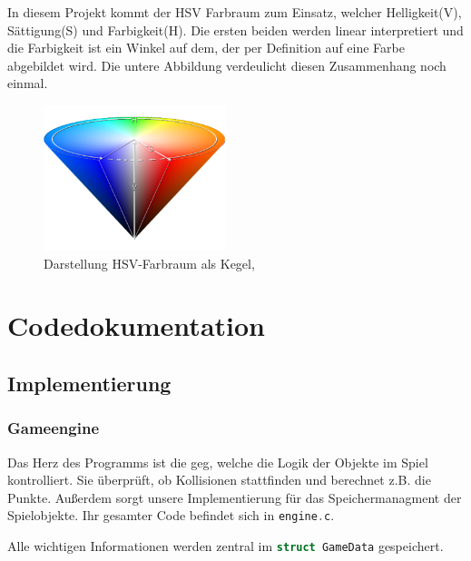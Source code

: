 \documentclass[11pt]{article}
\newcommand{\lstin}[1]{\lstinline[language=C]{#1}}
\begin{document}
In diesem Projekt kommt der HSV Farbraum zum Einsatz, welcher Helligkeit(V), Sättigung(S) und Farbigkeit(H).
Die ersten beiden werden linear interpretiert und die Farbigkeit ist ein Winkel auf dem, der per Definition auf eine Farbe abgebildet wird.
Die untere Abbildung verdeulicht diesen Zusammenhang noch einmal. 
\cite{CS2}
\begin{figure}[h]
  \centering
  \includegraphics[width=200px]{../images/hsv.png}
  \caption{Darstellung HSV-Farbraum als Kegel, \cite{picWiki}}
\end{figure}

\pagebreak

\section{Codedokumentation}


\subsection{Implementierung} 

\subsubsection{Gameengine} \label{gem}

Das Herz des Programms ist die \gls{geg}, welche die Logik der Objekte im Spiel kontrolliert.
Sie überprüft, ob Kollisionen stattfinden und berechnet z.B. die Punkte. 
Außerdem sorgt unsere Implementierung für das Speichermanagment der Spielobjekte.
Ihr gesamter Code befindet sich in \lstin{engine.c}.

Alle wichtigen Informationen werden zentral im \lstin{struct GameData} gespeichert.
\end{document}
